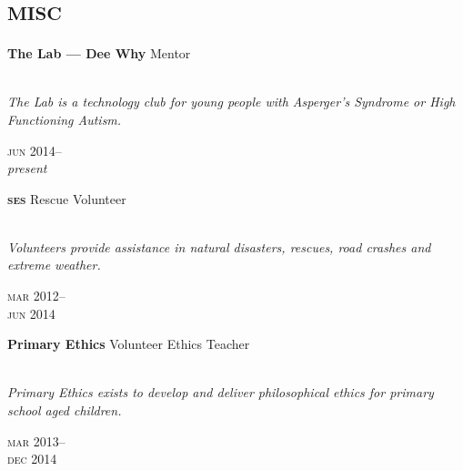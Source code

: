 

\section*{\textsc{misc}}
\vspace{-0.2cm}

\begin{minipage}[t]{0.75\textwidth}
\textbf{The Lab --- Dee Why}\phantom{..} Mentor \\
\\
{\small
\textit{The Lab is a technology club for young people with Asperger’s Syndrome or High Functioning Autism.}
\par}
\end{minipage}
\begin{minipage}[t]{0.25\textwidth}
{
\hfill \textsc{jun} 2014--\\ 
\hspace*{0pt} \hfill \textit{present}
\par
}
\end{minipage}

\vspace{0.2in}

\begin{minipage}[t]{0.75\textwidth}
\textbf{\textsc{ses}}\phantom{..} Rescue Volunteer\\
\\
{\small
\textit{Volunteers provide assistance in natural disasters, rescues, road crashes and extreme weather.}
\par}
\end{minipage}
\begin{minipage}[t]{0.25\textwidth}
{
\hfill \textsc{mar} 2012--\\ 
\hspace*{0pt} \hfill \textsc{jun} 2014
\par
}
\end{minipage}

\vspace{0.2in}

\begin{minipage}[t]{0.75\textwidth}
\textbf{Primary Ethics}\phantom{..} Volunteer Ethics Teacher \\
\\
{\small
\textit{Primary Ethics exists to develop and deliver philosophical ethics for primary school aged children.}
\par}
\end{minipage}
\begin{minipage}[t]{0.25\textwidth}
{
\hfill \textsc{mar} 2013--\\ 
\hspace*{0pt} \hfill \textsc{dec} 2014
\par
}
\end{minipage}

